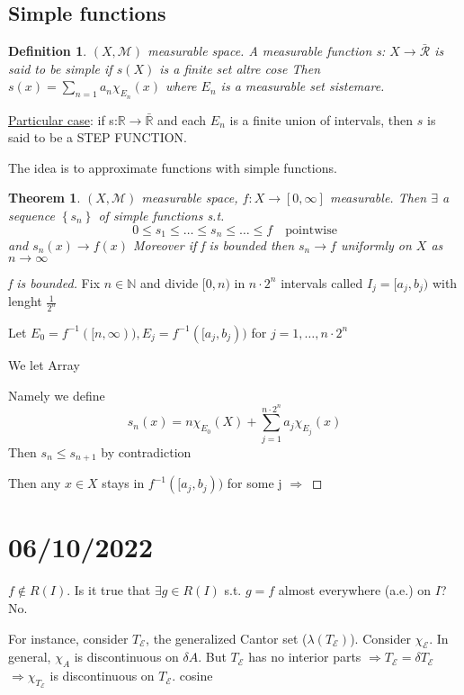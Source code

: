 \documentclass[a4paper,12pt]{article}
\theoremstyle{break}
\newtheorem{theorem}{Theorem}[section]
\newtheorem{definition}{Definition}[section]
\numberwithin{equation}{section}
\begin{document}
\subsection*{Simple functions}
\begin{definition}
    \((X, \mathcal{M})\) measurable space. A measurable function s: \(X \to \bar{\mathcal{R}}\) is said to be simple if \(s(X)\) is a finite set 
    altre cose 
    Then \(s(x) = \sum_{n = 1} a_n \chi_{E_n}(x)\) where \(E_n\) is a measurable set 
    sistemare. 
\end{definition}
\underline{Particular case}: if s:\(\mathbb{R} \to \bar{\mathbb{R}}\) and each \(E_n\) is a finite union of intervals, then \(s\) is said to be a STEP FUNCTION.

The idea is to approximate functions with simple functions.
\begin{theorem}
    \((X,\mathcal{M})\) measurable space, \(f: X \to [0, \infty]\) measurable. Then \(\exists\) a sequence \(\left\lbrace s_n \right\rbrace\) of simple functions s.t. 
    \[
        0 \leq s_1 \leq \ldots \leq s_n \leq \ldots \leq f \quad \mbox{pointwise}
    \]
    and \(s_n(x) \to f(x)\)
Moreover if f is bounded then \(s_n \to f\) uniformly on \(X\) as \(n \to \infty\)
\end{theorem}
\begin{proof}[f is bounded]
    Fix \(n \in \mathbb{N}\) and divide \([0,n)\) in \(n \cdot 2^n\) intervals called \(I_j = [a_j,b_j)\) with lenght \(\frac{1}{2^n}\)

    Let \(E_0 = f^{-1}([n, \infty)), E_j = f^{-1}([a_j, b_j))\) for \(j = 1, \ldots, n\cdot 2^n\)
    
    We let Array

    Namely we define 
    \[
    s_n (x) = n\chi_{E_0}(X) + \sum_{j =1}^{n \cdot 2^n} a_j \chi_{E_j}(x)    
    \]
    Then \(s_n \leq s_{n+1}\) by contradiction

    Then any \(x \in X\) stays in \(f^{-1}([a_j, b_j))\) for some j \(\Longrightarrow \) 
\end{proof}
\section{06/10/2022}
\(f \not \in R(I)\). Is it true that \(\exists g \in R(I)\) s.t. \(g = f\) almost everywhere (a.e.) on \(I\)? No.

For instance, consider \(T_{\mathcal{E}}\), the generalized Cantor set (\(\lambda(T_{\mathcal{E}})\)). Consider \(\chi_{\mathcal{E}}\). 
In general, \(\chi_{A}\) is discontinuous on \(\delta A\).  But \(T_{\mathcal{E}}\) has no interior parts \(\Longrightarrow T_{\mathcal{E}} = \delta T_{\mathcal{E}}\) \(\Longrightarrow \chi_{T_{\mathcal{E}}}\) is discontinuous on \(T_{\mathcal{E}}\). cosine
\end{document}

